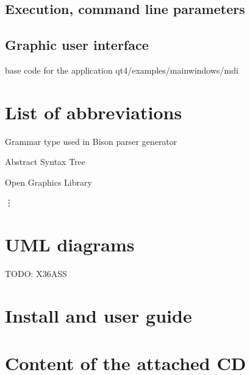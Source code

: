 \documentclass[11pt,twoside,a4paper]{book}
\begin{document}
\section{Execution, command line parameters}
\section{Graphic user interface}

base code for the application qt4/examples/mainwindows/mdi



\chapter{List of abbreviations}
\begin{description}
\setlength{\labelwidth}{2.5cm}
\setlength{\itemindent}{1.5cm}
\item[LALR] Grammar type used in Bison parser generator
\item[AST] Abstract Syntax Tree
\item[OpenGL] Open Graphics Library
\end{description}
\vdots



\chapter{UML diagrams}

TODO: X36ASS



\chapter{Install and user guide}



\chapter{Content of the attached CD}
\end{document}
